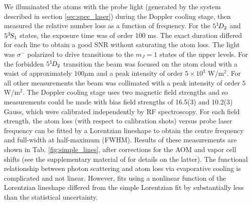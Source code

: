 

	

	We illuminated the atoms with the probe light (generated by the system described in section \ref{sec:spec_laser}) during the Doppler cooling stage, then measured the relative number loss as a function of frequency.
	For the $5^{1\!} D_2$ and $5^{3\!} S_1$ states, the exposure time was of order 100 ms. 
	The exact duration differed for each line to obtain a good SNR without saturating the atom loss.
	The light was $\sigma^-$ polarized to drive transitions to the $m_J=1$ states of the upper levels.
	For the forbidden $5^{1\!} D_2$ transition the beam was focused on the atom cloud with a waist of approximately $100\mu$m and a peak intensity of order $5\times 10^3$ W/m$^2$.
	For all other measurements the beam was collimated with a peak intensity of order $ 5$ W/m$^2$.
	The Doppler cooling stage uses two magnetic field strengths and so measurements could be made with bias field strengths of {16.5(3)} and {10.2(3)} Gauss, which were calibrated independently by RF spectroscopy.
	For each field strength, the atom loss (with respect to calibration shots) versus probe laser frequency can be fitted by a Lorentzian lineshape to obtain the centre frequency and full-width at half-maximum (FWHM).
	Results of these measurements are shown in Tab.	\ref{fig:simple_lines}, after corrections for the AOM and vapor cell shifts (see the supplementary material of \cite{Thomas20} for details on the latter).
	{The functional relationship between photon scattering and atom loss via evaporative cooling is complicated and not linear.
	However, fits using a nonlinear function of the Lorentzian lineshape differed from the simple Lorentzian fit by substantially less than the statistical uncertainty.}

